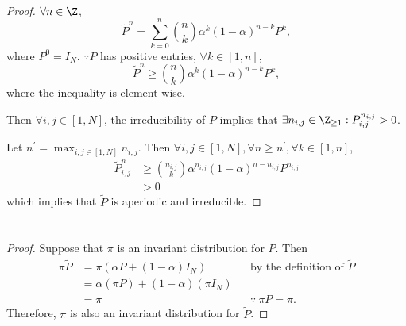 \documentclass[
  coursecode={MTHE 455},
  assignmentname={Assignment \assignmentnumber},
  studentnumber=20053722,
  name={Bryan Hoang},
  draft,
]{
  ltxanswer%
}
\begin{document}
  \begin{questions}
    \setcounter{question}{\questionnumber}
    \addtocounter{question}{-1}
    \question[7]\
    \begin{parts}
      \part{}
      \begin{solution}
        \begin{proof}
          \(\forall n\in\Z\),
          \begin{equation*}
            \tilde{P}^{n} = \sum_{k=0}^{n} \binom{n}{k} \alpha^{k} (1-\alpha)^{n-k} P^{k},
          \end{equation*}
          where \(P^{0}=I_{N}\). \(\because P\) has positive entries, \(\forall k\in[1,n]\),
          \begin{equation*}
            \tilde{P}^{n} \ge \binom{n}{k} \alpha^{k} (1-\alpha)^{n-k} P^{k},
          \end{equation*}
          where the inequality is element-wise.

          Then \(\forall i,j\in[1,N]\), the irreducibility of \(P\) implies that \(\exists n_{i,j}\in\Z_{\ge1}:P_{i,j}^{n_{i,j}}>0\).

          Let \(n^{'}=\max_{i,j\in[1,N]}n_{i,j}\). Then \(\forall i,j\in[1,N], \forall n\ge n^{'}, \forall k\in[1,n]\),
          \begin{align*}
            \tilde{P}_{i,j}^{n} &\ge \binom{n_{i,j}}{k} \alpha^{n_{i,j}} (1-\alpha)^{n-n_{i,j}} P^{n_{i,j}} \\
                                &> 0
          \end{align*}
          which implies that \(\tilde{P}\) is aperiodic and irreducible.
        \end{proof}
      \end{solution}

      \part{}
      \begin{solution}
        \begin{proof}
          Suppose that \(\pi\) is an invariant distribution for \(P\). Then
          \begin{align*}
            \pi\tilde{P} &= \pi(\alpha P + (1-\alpha) I_{N})        & &\text{by the definition of \(\tilde{P}\)} \\
                         &= \alpha(\pi P) + (1 - \alpha)(\pi I_{N})                                              \\
                         &= \pi                                     & &\because\ \pi P=\pi.
          \end{align*}
          Therefore, \(\pi\) is also an invariant distribution for \(\tilde{P}\).
        \end{proof}
      \end{solution}
    \end{parts}
  \end{questions}
\end{document}
